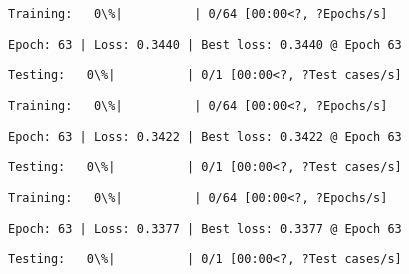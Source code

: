 \documentclass[11pt]{article}
\begin{document}
    
    
    \begin{Verbatim}[commandchars=\\\{\}]
Training:   0\%|          | 0/64 [00:00<?, ?Epochs/s]
    \end{Verbatim}

    
    \begin{Verbatim}[commandchars=\\\{\}]
Epoch: 63 | Loss: 0.3440 | Best loss: 0.3440 @ Epoch 63
    \end{Verbatim}

    
    \begin{Verbatim}[commandchars=\\\{\}]
Testing:   0\%|          | 0/1 [00:00<?, ?Test cases/s]
    \end{Verbatim}

    
    
    \begin{Verbatim}[commandchars=\\\{\}]
Training:   0\%|          | 0/64 [00:00<?, ?Epochs/s]
    \end{Verbatim}

    
    \begin{Verbatim}[commandchars=\\\{\}]
Epoch: 63 | Loss: 0.3422 | Best loss: 0.3422 @ Epoch 63
    \end{Verbatim}

    
    \begin{Verbatim}[commandchars=\\\{\}]
Testing:   0\%|          | 0/1 [00:00<?, ?Test cases/s]
    \end{Verbatim}

    
    
    \begin{Verbatim}[commandchars=\\\{\}]
Training:   0\%|          | 0/64 [00:00<?, ?Epochs/s]
    \end{Verbatim}

    
    \begin{Verbatim}[commandchars=\\\{\}]
Epoch: 63 | Loss: 0.3377 | Best loss: 0.3377 @ Epoch 63
    \end{Verbatim}

    
    \begin{Verbatim}[commandchars=\\\{\}]
Testing:   0\%|          | 0/1 [00:00<?, ?Test cases/s]
    \end{Verbatim}
\end{document}
